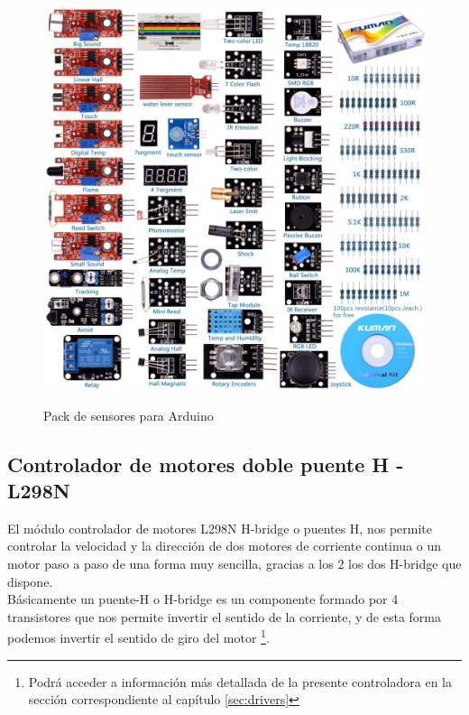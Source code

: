\begin{figure}[H]
  \begin{center}
    \includegraphics[scale=0.35]{imagenes/arduino_sensor_kit.jpg}\\
    \caption{Pack de sensores para Arduino}
  \end{center}
\end{figure}

\subsection{Controlador de motores doble puente H - L298N}


El módulo controlador de motores L298N H-bridge o puentes H, nos permite controlar la velocidad y la dirección de dos motores de corriente continua o un motor paso a paso de una forma muy sencilla,
gracias a los 2 los dos H-bridge que dispone.\\

Básicamente un puente-H o H-bridge es un componente formado por 4 transistores que nos permite invertir el sentido de la corriente, y de esta forma podemos 
invertir el sentido de giro del motor \footnote{Podrá acceder a información más detallada de la presente controladora en la sección correspondiente al capítulo \ref{sec:drivers} }.\\

